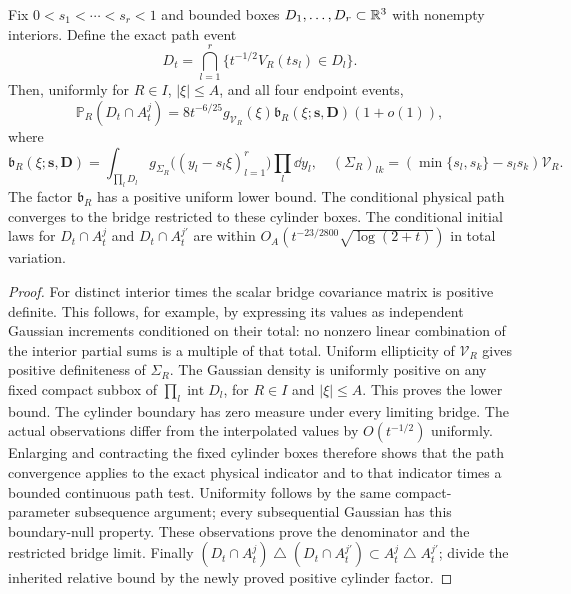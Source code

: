 \begin{corollary}
\label{cor:bridge-cylinder-events}
Fix $0<s_1<\cdots<s_r<1$ and bounded boxes
$D_1,\ldots,D_r\subset\mathbb R^3$ with nonempty interiors. Define the
exact path event
\[
 D_t=\bigcap_{l=1}^r\{t^{-1/2}V_R(ts_l)\in D_l\}.
\]
Then, uniformly for $R\in I$, $|\xi|\le A$, and all four endpoint
events,
\begin{equation}\label{eq:bridge-cylinder-denominator}
 \mathbb P_R(D_t\cap A_t^j)
 =8t^{-6/25}g_{\mathcal V_R}(\xi)
       \mathfrak b_R(\xi;\mathbf s,\mathbf D)(1+o(1)),
\end{equation}
where
\[
 \mathfrak b_R(\xi;\mathbf s,\mathbf D)
  =\int_{\prod_lD_l}
      g_{\Sigma_R}\bigl((y_l-s_l\xi)_{l=1}^r\bigr)
                           \prod_l\dd y_l,\quad
 (\Sigma_R)_{lk}=(\min\{s_l,s_k\}-s_ls_k)\mathcal V_R.
\]
The factor $\mathfrak b_R$ has a positive uniform lower bound.
The conditional physical path converges to the bridge restricted to
these cylinder boxes. The conditional initial laws for
$D_t\cap A_t^j$ and $D_t\cap A_t^{j'}$ are within
$O_A(t^{-23/2800}\sqrt{\log(2+t)})$ in total variation.
\end{corollary}
\begin{proof}
For distinct interior times the scalar bridge covariance matrix is
positive definite. This follows, for example, by expressing its values
as independent Gaussian increments conditioned on their total: no
nonzero linear combination of the interior partial sums is a multiple
of that total. Uniform ellipticity of $\mathcal V_R$ gives positive
definiteness of $\Sigma_R$. The Gaussian density is uniformly positive
on any fixed compact subbox of $\prod_l\operatorname{int}D_l$, for
$R\in I$ and $|\xi|\le A$. This proves the lower bound.
The cylinder boundary has zero measure under every limiting bridge.
The actual observations differ from the interpolated values by
$O(t^{-1/2})$ uniformly. Enlarging and contracting the fixed cylinder
boxes therefore shows that the path convergence applies to the exact
physical indicator and to that indicator times a bounded continuous
path test. Uniformity follows by
the same compact-parameter subsequence argument; every subsequential
Gaussian has this boundary-null property. These observations prove
the denominator and the restricted bridge limit. Finally
$(D_t\cap A_t^j)\mathbin\triangle(D_t\cap A_t^{j'})
\subset A_t^j\mathbin\triangle A_t^{j'}$; divide the inherited
relative bound by the newly proved positive cylinder factor.
\end{proof}

